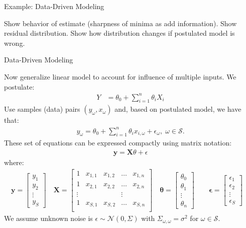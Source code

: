 \documentclass[9pt]{beamer}
\begin{document}
%
\begin{frame}{Example: Data-Driven Modeling}

\begin{block}{}
Show behavior of estimate (sharpness of minima as add information).  Show residual distribution.  Show how distribution changes if postulated model is wrong. 
\end{block}

\end{frame}

%
\begin{frame}{Data-Driven Modeling}

Now generalize linear model to account for influence of multiple inputs. We postulate:
\begin{align*}
Y&=\theta_0+\sum_{i=1}^n\theta_iX_i
\end{align*}
Use samples (data) pairs $(y_\omega,x_\omega)$ and, based on postulated model, we have that:
\begin{align*}
y_\omega=\theta_0+\sum_{i=1}^n\theta_i x_{i,\omega} + \epsilon_\omega,\; \omega \in \mathcal{S}.
\end{align*}
These set of equations can be expressed compactly using matrix notation:
\begin{align*}
\mathbf{y}=\mathbf{X}\theta + \epsilon
\end{align*}
where:
\begin{align*}
\mathbf{y}=\left[\begin{array}{c}y_1\\y_2\\\vdots \\ y_S\end{array}\right]\quad 
\mathbf{X}=\left[\begin{array}{ccccc}1&x_{1,1}&x_{1,2}&\hdots&x_{1,n}\\
1&x_{2,1}&x_{2,2}&\hdots&x_{2,n}\\
\vdots&&&\vdots\\
1&x_{S,1}&x_{S,2}&\hdots&x_{S,n}\\
\end{array}\right]\quad \mathbf{\theta}=\left[\begin{array}{c}\theta_0\\\theta_1\\\vdots \\ \theta_n\end{array}\right]\quad 
\quad \mathbf{\epsilon}=\left[\begin{array}{c}\epsilon_1\\\epsilon_2\\\vdots \\ \epsilon_S\end{array}\right]\quad 
\end{align*}
We assume unknown noise is $\epsilon\sim \mathcal{N}(0,\Sigma)$ with $\Sigma_{\omega,\omega}=\sigma^2$ for $\omega\in\mathcal{S}$. 

\end{frame}
\end{document}
